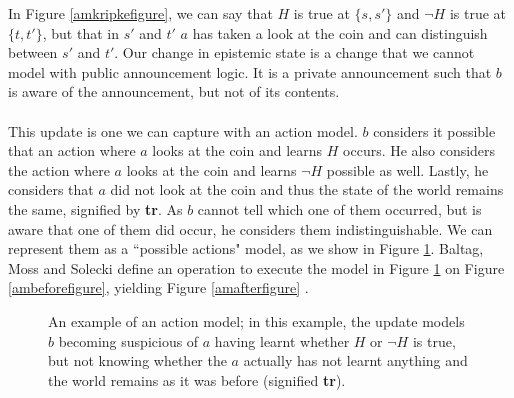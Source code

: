 In Figure \ref{amkripkefigure}, we can say that $H$ is true at $\{s,s'\}$ and $\neg H$ is
true at $\{t,t'\}$, but that in $s'$ and $t'$ $a$ has taken a look
at the coin and can distinguish between $s'$ and $t'$.
Our change in epistemic state is a change that we cannot model with public
announcement logic.
It is a private announcement such that $b$ is aware of the announcement, but not
of its contents.\\
\\
This update is one we can capture with an action model.
$b$ considers it possible that an action where $a$ looks at the coin and learns
$H$ occurs.
He also considers the action where $a$ looks at the coin and learns $\neg H$ possible
as well.
Lastly, he considers that $a$ did not look at the coin and thus the state of the
world remains the same, signified by {\bf tr}.
As $b$ cannot tell which one of them occurred, but is aware that one of them did
occur, he considers them indistinguishable.
We can represent them as a ``possible actions" model, as we show in Figure
\ref{amprivatea}.
Baltag, Moss and Solecki define an operation to execute the model in Figure
\ref{amprivatea} on Figure \ref{ambeforefigure}, yielding Figure
\ref{amafterfigure} \cite{baltag1998lpa}.

\begin{figure}[H]
\centering
{}
\caption[Example action model]{An example of an action model; in this example, the update models $b$
becoming suspicious of $a$ having learnt whether $H$ or $\neg H$ is true, but not
knowing whether the $a$ actually has not learnt anything and the world remains
as it was before (signified {\bf tr}).}
\label{amprivatea}
\end{figure}

